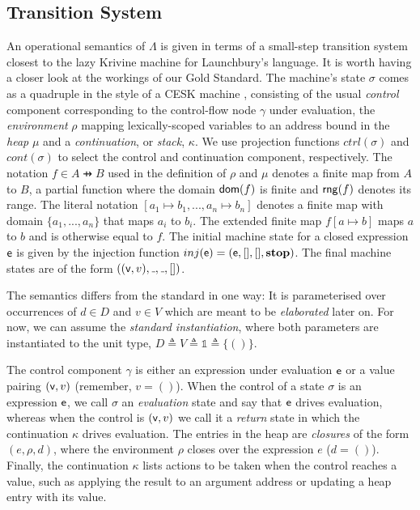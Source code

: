 \subsection{Transition System}

An operational semantics of $Λ$ is given in terms of a small-step transition
system closest to the lazy Krivine machine \cite{AgerDanvyMidtgaard:04} for
Launchbury's language.
It is worth having a closer look at the workings of our Gold Standard.
The machine's state $σ$ comes as a quadruple in the style of a CESK machine
\cite{Felleisen:87}, consisting of the usual \emph{control} component
corresponding to the control-flow node $γ$ under evaluation, the
\emph{environment} $ρ$ mapping lexically-scoped variables to an address bound in
the \emph{heap} $μ$ and a \emph{continuation}, or \emph{stack}, $κ$.
We use projection functions $ctrl(σ)$ and $cont(σ)$ to select the control and
continuation component, respectively.
The notation $f ∈ A \pfun B$ used in the definition of $ρ$ and $μ$ denotes a
finite map from $A$ to $B$, a partial function where the domain $\mathop\mathsf{dom}(f)$ is
finite and $\mathop\mathsf{rng}(f)$ denotes its range.
The literal notation $[a_1↦b_1,...,a_n↦b_n]$ denotes a finite map with domain
$\{a_1,...,a_n\}$ that maps $a_i$ to $b_i$. The extended finite map $f[a ↦ b]$
maps $a$ to $b$ and is otherwise equal to $f$.
The initial machine state for a closed expression $\mathsf{e}$ is given by the
injection function $inj(\mathsf{e}) = (\mathsf{e},[],[],\mathbf{stop})$.
The final machine states are of the form $((\pv,v),\wild,\wild,[])$.

The semantics differs from the standard in one way: It is parameterised over
occurrences of $d ∈ D$ and $v ∈ V$ which are meant to be \emph{elaborated} later
on. For now, we can assume the \emph{standard instantiation}, where both
parameters are instantiated to the unit type, $D \triangleq V \triangleq
\mathbb{1} \triangleq \{ () \}$.

The control component $γ$ is either an expression under evaluation $\mathsf{e}$ or a
value pairing $(\mathsf{v},v)$ (remember, $v = ()$).
When the control of a state $σ$ is an expression $\mathsf{e}$, we call $σ$ an
\emph{evaluation} state and say that $\mathsf{e}$ drives evaluation, whereas when the
control is $(\mathsf{v}, v)$ we call it a \emph{return} state in which the continuation
$κ$ drives evaluation.
The entries in the heap are \emph{closures} of the form $(e,ρ,d)$, where the
environment $ρ$ closes over the expression $e$ ($d = ()$).
Finally, the continuation $κ$ lists actions to be taken when the control reaches
a value, such as applying the result to an argument address or updating a heap
entry with its value.

